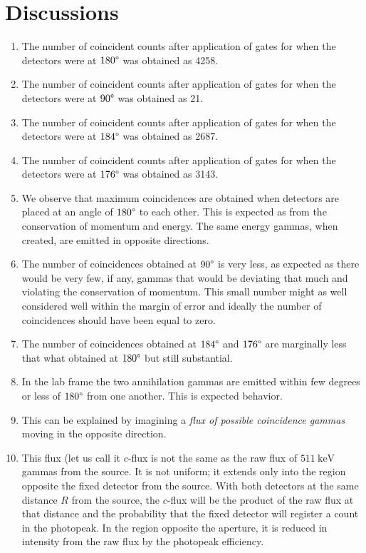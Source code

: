 \documentclass[%
 reprint,
nofootinbib,
 amsmath,amssymb,
 aps,
floatfix,
]{revtex4-2}
\begin{document}
    
\section{Discussions}
    \begin{enumerate}
        \item The number of coincident counts after application of gates for when the detectors were at $180 \degree$ was obtained as 4258.
        \item The number of coincident counts after application of gates for when the detectors were at $90 \degree$ was obtained as 21.
        \item The number of coincident counts after application of gates for when the detectors were at $184 \degree$ was obtained as 2687.
        \item The number of coincident counts after application of gates for when the detectors were at $176 \degree$ was obtained as 3143.
        \item We observe that maximum coincidences are obtained when detectors are placed at an angle of $180 \degree$ to each other. This is expected as from the conservation of momentum and energy. The same energy gammas, when created, are emitted in opposite directions.
        \item The number of coincidences obtained at $90 \degree$ is very less, as expected as there would be very few, if any, gammas that would be deviating that much and violating the conservation of momentum. This small number might as well considered well within the margin of error and ideally the number of coincidences should have been equal to zero.
        \item The number of coincidences obtained at $184 \degree$ and $176 \degree$ are marginally less that what obtained at $180 \degree$ but still substantial.
        \item In the lab frame the two annihilation gammas are emitted within few degrees or less of $180 \degree$ from one another. This is expected behavior.
        \item This can be explained by imagining a \textit{flux of possible coincidence gammas} moving in the opposite direction.
        \item This flux (let us call it $c$-flux is not the same as the raw flux of $\SI{511}{\kilo \electronvolt}$ gammas from the source. It is not uniform; it extends only into the region opposite the fixed detector from the source. With both detectors at the same distance $R$ from the source, the $c$-flux will be the product of the raw flux at that distance and the probability that the fixed detector will register a count in the photopeak. In the region opposite the aperture, it is reduced in intensity from the raw flux by the photopeak efficiency.

\end{enumerate}
\end{document}
